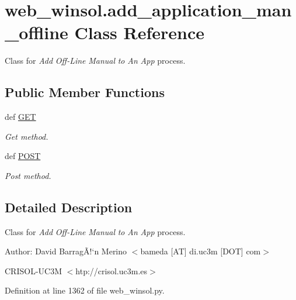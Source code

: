\hypertarget{classweb__winsol_1_1add__application__man__offline}{
\section{web\_\-winsol.add\_\-application\_\-man\_\-offline Class Reference}
\label{classweb__winsol_1_1add__application__man__offline}
}
Class for {\em Add\/} {\em Off-Line\/} {\em Manual\/} {\em to\/} {\em An\/} {\em App\/} process.  


\subsection*{Public Member Functions}
\begin{CompactItemize}
\item 
def \hyperlink{classweb__winsol_1_1add__application__man__offline_994572f45ede04821775f37da31550ba}{GET}
\begin{CompactList}\small\item\em Get method. \item\end{CompactList}\item 
def \hyperlink{classweb__winsol_1_1add__application__man__offline_04a20988aa73846dd2ba18e793f858a2}{POST}
\begin{CompactList}\small\item\em Post method. \item\end{CompactList}\end{CompactItemize}


\subsection{Detailed Description}
Class for {\em Add\/} {\em Off-Line\/} {\em Manual\/} {\em to\/} {\em An\/} {\em App\/} process. 

\begin{Desc}
\item[Author:]David Barrag\~{A}!`n Merino $<$bameda \mbox{[}AT\mbox{]} di.uc3m \mbox{[}DOT\mbox{]} com$>$ 

CRISOL-UC3M $<$htp://crisol.uc3m.es$>$ \end{Desc}




Definition at line 1362 of file web\_\-winsol.py.

